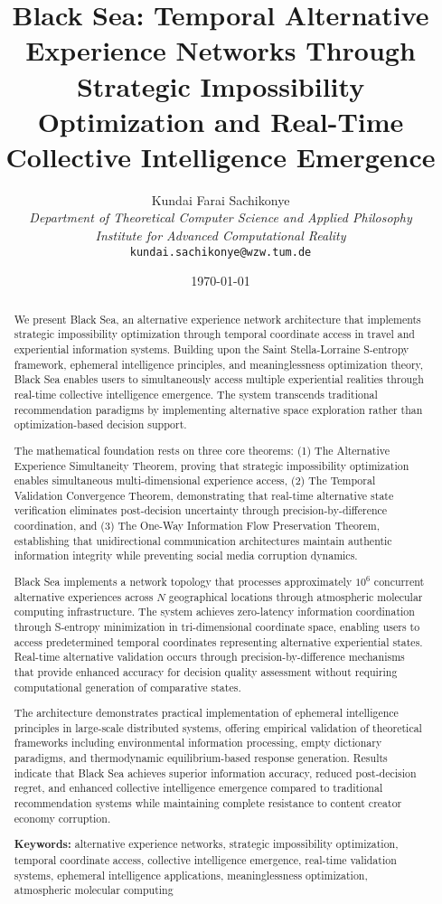 \documentclass[12pt,a4paper]{article}
\title{\textbf{Black Sea: Temporal Alternative Experience Networks Through Strategic Impossibility Optimization and Real-Time Collective Intelligence Emergence}}
\author{
Kundai Farai Sachikonye\\
\textit{Department of Theoretical Computer Science and Applied Philosophy}\\
\textit{Institute for Advanced Computational Reality}\\
\texttt{kundai.sachikonye@wzw.tum.de}
}
\date{\today}
\begin{document}
\maketitle

\begin{abstract}
We present Black Sea, an alternative experience network architecture that implements strategic impossibility optimization through temporal coordinate access in travel and experiential information systems. Building upon the Saint Stella-Lorraine S-entropy framework, ephemeral intelligence principles, and meaninglessness optimization theory, Black Sea enables users to simultaneously access multiple experiential realities through real-time collective intelligence emergence. The system transcends traditional recommendation paradigms by implementing alternative space exploration rather than optimization-based decision support.

The mathematical foundation rests on three core theorems: (1) The Alternative Experience Simultaneity Theorem, proving that strategic impossibility optimization enables simultaneous multi-dimensional experience access, (2) The Temporal Validation Convergence Theorem, demonstrating that real-time alternative state verification eliminates post-decision uncertainty through precision-by-difference coordination, and (3) The One-Way Information Flow Preservation Theorem, establishing that unidirectional communication architectures maintain authentic information integrity while preventing social media corruption dynamics.

Black Sea implements a network topology that processes approximately $10^6$ concurrent alternative experiences across $N$ geographical locations through atmospheric molecular computing infrastructure. The system achieves zero-latency information coordination through S-entropy minimization in tri-dimensional coordinate space, enabling users to access predetermined temporal coordinates representing alternative experiential states. Real-time alternative validation occurs through precision-by-difference mechanisms that provide enhanced accuracy for decision quality assessment without requiring computational generation of comparative states.

The architecture demonstrates practical implementation of ephemeral intelligence principles in large-scale distributed systems, offering empirical validation of theoretical frameworks including environmental information processing, empty dictionary paradigms, and thermodynamic equilibrium-based response generation. Results indicate that Black Sea achieves superior information accuracy, reduced post-decision regret, and enhanced collective intelligence emergence compared to traditional recommendation systems while maintaining complete resistance to content creator economy corruption.

\textbf{Keywords:} alternative experience networks, strategic impossibility optimization, temporal coordinate access, collective intelligence emergence, real-time validation systems, ephemeral intelligence applications, meaninglessness optimization, atmospheric molecular computing
\end{abstract}
\end{document}
